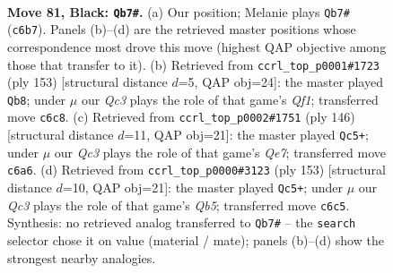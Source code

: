 \documentclass[11pt]{article}
\begin{document}
\clearpage

\begin{figure}[p]\centering
\begin{subfigure}{0.46\textwidth}\centering
\resizebox{\linewidth}{!}{%
\newchessgame
\chessboard[
  setfen={3Q4/K7/2q2pk1/8/8/6P1/1r6/8 b - - 13 81},
  showmover=false,
  pgfstyle=straightmove, color=movearrow, markmove={c6-b7}
]}
\caption{}
\end{subfigure}\hfill
\begin{subfigure}{0.46\textwidth}\centering
\resizebox{\linewidth}{!}{%
\newchessgame
\chessboard[
  setfen={5q2/3Q4/8/5pk1/8/1P6/8/7K b - - 13 77},
  showmover=false,
  pgfstyle=straightmove, color=movearrow, markmove={f8-b8}
]}
\caption{}
\end{subfigure}
\\[4pt]
\begin{subfigure}{0.46\textwidth}\centering
\resizebox{\linewidth}{!}{%
\newchessgame
\chessboard[
  setfen={8/4Q3/1k6/8/1P3p2/8/3q4/K7 w - - 4 74},
  showmover=false,
  pgfstyle=straightmove, color=movearrow, markmove={e7-c5}
]}
\caption{}
\end{subfigure}\hfill
\begin{subfigure}{0.46\textwidth}\centering
\resizebox{\linewidth}{!}{%
\newchessgame
\chessboard[
  setfen={8/7k/8/4K3/pq4P1/8/Q7/8 b - - 13 77},
  showmover=false,
  pgfstyle=straightmove, color=movearrow, markmove={b4-c5}
]}
\caption{}
\end{subfigure}
\caption{\textbf{Move 81, Black: \texttt{Qb7\#}.} (a) Our position; Melanie plays \texttt{Qb7\#} (\texttt{c6b7}). Panels (b)--(d) are the retrieved master positions whose correspondence most drove this move (highest QAP objective among those that transfer to it). (b) Retrieved from \texttt{ccrl\_top\_p0001\#1723} (ply 153) [structural distance $d$=5, QAP obj=24]: the master played \texttt{Qb8}; under $\mu$ our \emph{Qc3} plays the role of that game's \emph{Qf1}; transferred move \texttt{c6c8}. (c) Retrieved from \texttt{ccrl\_top\_p0002\#1751} (ply 146) [structural distance $d$=11, QAP obj=21]: the master played \texttt{Qc5+}; under $\mu$ our \emph{Qc3} plays the role of that game's \emph{Qe7}; transferred move \texttt{c6a6}. (d) Retrieved from \texttt{ccrl\_top\_p0000\#3123} (ply 153) [structural distance $d$=10, QAP obj=21]: the master played \texttt{Qc5+}; under $\mu$ our \emph{Qc3} plays the role of that game's \emph{Qb5}; transferred move \texttt{c6c5}. Synthesis: no retrieved analog transferred to \texttt{Qb7\#} -- the \texttt{search} selector chose it on value (material / mate); panels (b)--(d) show the strongest nearby analogies.}
\label{fig:thought-m161}
\end{figure}
\end{document}
